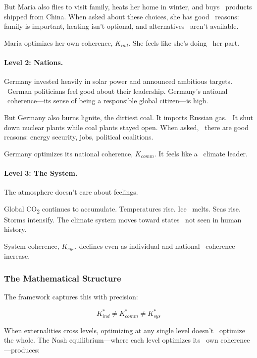 But Maria also flies to visit family, heats her home in winter, and buys \
products shipped from China. When asked about these choices, she has good \
reasons: family is important, heating isn't optional, and alternatives \
aren't available.

Maria optimizes her own coherence, $K_{ind}$. She feels like she's doing \
her part.

\paragraph{Level 2: Nations.}

Germany invested heavily in solar power and announced ambitious targets. \
German politicians feel good about their leadership. Germany's national \
coherence---its sense of being a responsible global citizen---is high.

But Germany also burns lignite, the dirtiest coal. It imports Russian gas. \
It shut down nuclear plants while coal plants stayed open. When asked, \
there are good reasons: energy security, jobs, political coalitions.

Germany optimizes its national coherence, $K_{comm}$. It feels like a \
climate leader.

\paragraph{Level 3: The System.}

The atmosphere doesn't care about feelings.

Global CO\textsubscript{2} continues to accumulate. Temperatures rise. Ice \
melts. Seas rise. Storms intensify. The climate system moves toward states \
not seen in human history.

System coherence, $K_{sys}$, declines even as individual and national \
coherence increase.

\subsubsection{The Mathematical Structure}

The framework captures this with precision:

\begin{equation}
K_{ind}^* \neq K_{comm}^* \neq K_{sys}^*
\end{equation}

When externalities cross levels, optimizing at any single level doesn't \
optimize the whole. The Nash equilibrium---where each level optimizes its \
own coherence---produces:

